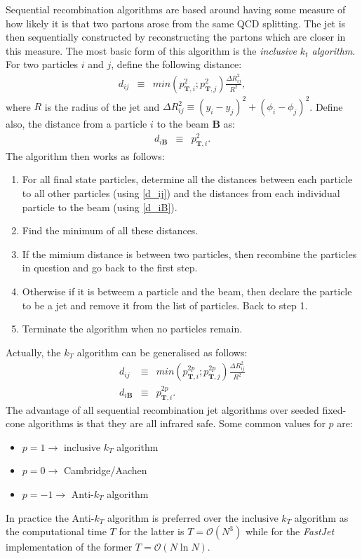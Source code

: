 Sequential recombination algorithms are based around having some measure of how likely it is that two partons arose from the same QCD splitting. The jet is then sequentially constructed by reconstructing the partons which are closer in this measure. The most basic form of this algorithm is the \emph{inclusive $k_{t}$ algorithm}. For two particles $i$ and $j$, define the following distance:
\begin{eqnarray}
\label{d_ij}
d_{ij} & \equiv & min\left( p^{2}_{\mathbf{T},i};p^{2}_{\mathbf{T},j} \right) \frac{\Delta R_{ij}^{2}}{R^{2}},
\end{eqnarray}
where $R$ is the radius of the jet and $\Delta R_{ij}^{2}  \equiv  \left( y_{i} - y_{j}\right)^{2} + \left( \phi_{i} - \phi_{j} \right) ^{2}$. Define also, the distance from a particle $i$ to the beam \textbf{B} as:
\begin{eqnarray}
\label{d_iB}
d_{i \mathbf{B}} & \equiv & p_{\mathbf{T},i}^{2}.
\end{eqnarray}
The algorithm then works as follows:
\begin{enumerate}
\item For all final state particles, determine all the distances between each particle to all other particles (using \ref{d_ij}) and the distances from each individual particle to the beam (using \ref{d_iB}).
\item Find the minimum of all these distances.
\item If the mimium distance is between two particles, then recombine the particles in question and go back to the first step.
\item Otherwise if it is betweem a particle and the beam, then declare the particle to be a jet and remove it from the list of particles. Back to step 1.
\item Terminate the algorithm when no particles remain.
\end{enumerate}
Actually, the $k_{T}$ algorithm can be generalised as follows:
\begin{eqnarray}
d_{ij} & \equiv & min\left( p^{2p}_{\mathbf{T},i};p^{2p}_{\mathbf{T},j} \right) \frac{\Delta R_{ij}^{2}}{R^{2}} \\
d_{i \mathbf{B}} & \equiv & p_{\mathbf{T},i}^{2p}.
\end{eqnarray}
The advantage of all sequential recombination jet algorithms over seeded fixed-cone algorithms is that they are all infrared safe. Some common values for $p$ are:
\begin{itemize}
\item $p = 1 \longrightarrow$ inclusive $k_{T}$ algorithm \cite{kt}
\item $p = 0 \longrightarrow$ Cambridge/Aachen \cite{cambridge-aachen}
\item $p = -1 \longrightarrow$ Anti-$k_{T}$ algorithm \cite{anti-kt}
\end{itemize}
In practice the Anti-$k_{T}$ algorithm is preferred over the inclusive $k_{T}$ algorithm as the computational time $T$ for the latter is $T= \mathcal{O}\left(N^{3}\right)$ while for the \emph{FastJet} \cite{fastjet} implementation of the former $T = \mathcal{O}\left(N \ln {N}\right)$.
